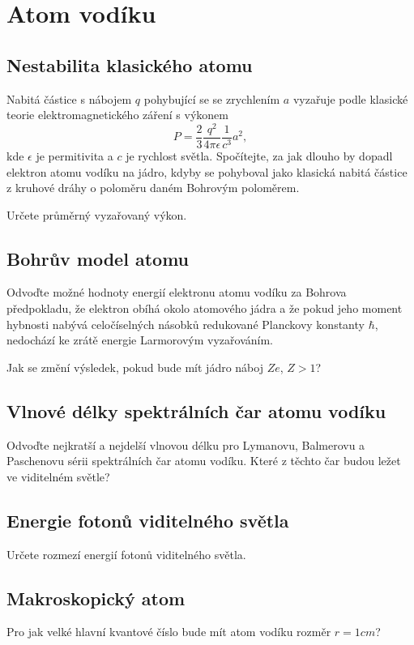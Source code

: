 \section{Atom vodíku}
\subsection{Nestabilita klasického atomu}
    Nabitá částice s nábojem $q$ pohybující se se zrychlením $a$ vyzařuje podle klasické teorie elektromagnetického záření s výkonem
    \begin{equation}
        P=\frac{2}{3}\frac{q^2}{4\pi\epsilon}\frac{1}{c^3}a^{2},
    \end{equation}
    kde $\epsilon$ je permitivita a $c$ je rychlost světla.
    Spočítejte, za jak dlouho by dopadl elektron atomu vodíku na jádro, kdyby se pohyboval jako klasická nabitá částice z kruhové dráhy o poloměru daném Bohrovým poloměrem.

    Určete průměrný vyzařovaný výkon.

\subsection{Bohrův model atomu}
    Odvoďte možné hodnoty energií elektronu atomu vodíku za Bohrova předpokladu, že elektron obíhá okolo atomového jádra a že pokud jeho moment hybnosti nabývá celočíselných násobků redukované Planckovy konstanty $\hbar$, nedochází ke zrátě energie Larmorovým vyzařováním.

    Jak se změní výsledek, pokud bude mít jádro náboj $Ze$, $Z>1$?

\subsection{Vlnové délky spektrálních čar atomu vodíku}
    Odvoďte nejkratší a nejdelší vlnovou délku pro Lymanovu, Balmerovu a Paschenovu sérii spektrálních čar atomu vodíku. Které z těchto čar budou ležet ve viditelném světle?

\subsection{Energie fotonů viditelného světla}
    Určete rozmezí energií fotonů viditelného světla.

\subsection{Makroskopický atom}
    Pro jak velké hlavní kvantové číslo bude mít atom vodíku rozměr $r=1\unit{cm}$?


